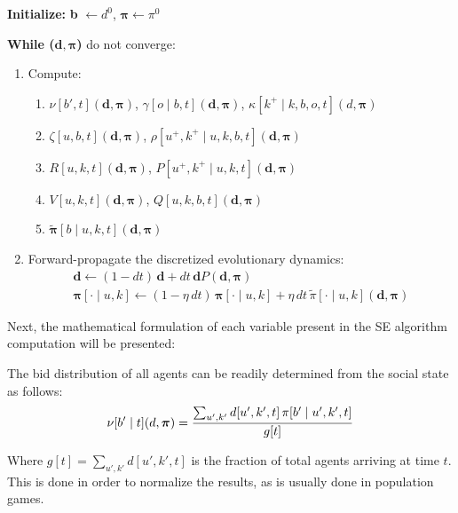 \documentclass[a4paper,11pt,twoside]{book}
\begin{document}
\textbf{Initialize:} \textbf{b} $\leftarrow d^0$, $\bm{\pi} \leftarrow \pi^0$

\textbf{While ($\bm{d}, \bm{\pi}$)} do not converge:

\begin{enumerate}
    \item Compute:
    \begin{enumerate}
        \item $\nu[b',t](\bm{d},\bm{\pi})$, $\gamma[o \mid b,t](\bm{d},\bm{\pi})$, $\kappa[k^+ \mid k,b,o,t](d,\bm{\pi})$
        
        \item $\zeta[u,b,t](\bm{d},\bm{\pi})$, $\rho[u^+,k^+ \mid u,k,b,t](\bm{d},\bm{\pi})$
        
        \item $R[u,k,t](\bm{d},\bm{\pi})$, $P[u^+,k^+ \mid u,k,t](\bm{d},\bm{\pi})$
        
        \item $V[u,k,t](\bm{d},\bm{\pi})$, $Q[u,k,b,t](\bm{d},\bm{\pi})$
        
        \item $\bm{\tilde{\pi}}[b \mid u,k,t](\bm{d},\bm{\pi})$
    \end{enumerate}
    
    \item Forward-propagate the discretized evolutionary dynamics:
    \begin{gather}
        \bm{d} \leftarrow (1-dt) \, \bm{d} + dt \, \bm{d}P(\bm{d}, \bm{\pi})\\
        \bm{\pi}[\cdot \mid u,k] \leftarrow (1-\eta \, dt) \,  \bm{\pi}[\cdot \mid u,k] + \eta \, dt \, \tilde{\pi} [\cdot \mid u,k](\bm{d}, \bm{\pi})
    \end{gather}
\end{enumerate}


Next, the mathematical formulation of each variable present in the SE algorithm computation will be presented:

The bid distribution of all agents can be readily determined from the social state as follows:
\begin{equation}
    \nu[b'\mid t](d,\bm{\pi}) = \frac{\sum_{u',k'} d[u',k',t] \, \pi[b' \mid u',k',t]}{g[t]}\\
\end{equation}

Where \(g[t] = \sum_{u',k'} d[u',k',t]\) is the fraction of total agents arriving at time $t$. This is done in order to normalize the results, as is usually done in population games.\\
\end{document}

